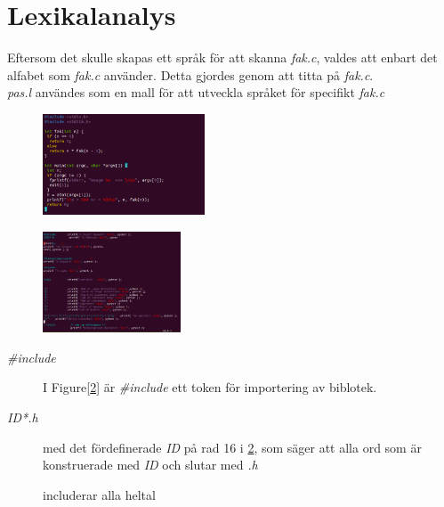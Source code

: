 \section{Lexikalanalys}

Eftersom det skulle skapas ett språk för att skanna \textit{fak.c}, valdes att enbart det alfabet
som \textit{fak.c} använder. Detta gjordes genom att titta på \textit{fak.c}.
\\ \textit{pas.l} användes som en mall för att utveckla språket för specifikt \textit{fak.c} 

\begin{figure}[!h]
    \includegraphics[width=\linewidth,height=3cm]{bilder/fak_c.png}
    \label{fig:fak_c}
\end{figure}


\begin{figure}[!h]
    \includegraphics[width=\linewidth,height=3cm]{bilder/fak_l.png}
    \label{fig:fak_l}
\end{figure}


\begin{description}

\item[\textit{\#include}] I Figure[\ref{fig:fak_l}] är \textit{\#include} ett token för importering av biblotek. 

\item[\textit{{ID}*.h} ] med det fördefinerade \textit{ID} på rad 16 i
\ref{fig:fak_l}, som säger att alla ord som är konstruerade med \textit{ID} och slutar
med \textit{.h}

\item[\textit{{DIGIT}+] includerar alla heltal


\end{description}
